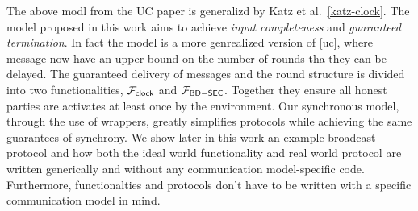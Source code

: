 The above modl from the UC paper is generalizd by Katz et al.~\ref{katz-clock}.
The model proposed in this work aims to achieve \emph{input completeness} and \emph{guaranteed termination}.
In fact the model is a more genrealized version of \ref{uc}, where message now have an upper bound on the number of rounds tha they can be delayed.
The guaranteed delivery of messages and the round structure is divided into two functionalities, $\mathcal{F}_{{\mathsf {clock}}}$ and $\mathcal{F}_{{\mathsf {BD-SEC}}}$.
Together they ensure all honest parties are activates at least once by the environment.
Our synchronous model, through the use of wrappers, greatly simplifies protocols while achieving the same guarantees of synchrony.
We show later in this work an example broadcast protocol and how both the ideal world functionality and real world protocol are written generically and without any communication model-specific code.
Furthermore, functionalties and protocols don't have to be written with a specific communication model in mind.



%
\clearpage

